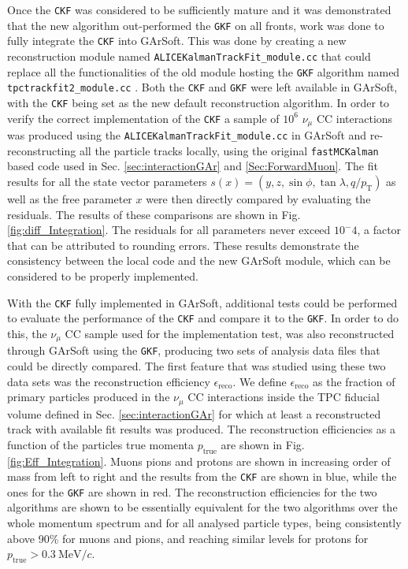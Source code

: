 Once the \texttt{CKF} was considered to be sufficiently mature and it was demonstrated that the new algorithm out-performed the \texttt{GKF} on all fronts, work was done to fully integrate the \texttt{CKF} into GArSoft. This was done by creating a new reconstruction module named \texttt{ALICEKalmanTrackFit\_module.cc} that could replace all the functionalities of the old module hosting the \texttt{GKF} algorithm named \texttt{tpctrackfit2\_module.cc} \cite{PullRequest}. Both the \texttt{CKF} and \texttt{GKF} were left available in GArSoft, with the \texttt{CKF} being set as the new default reconstruction algorithm. In order to verify the correct implementation of the \texttt{CKF} a sample of $10^6$ $\nu_\mu$ CC interactions was produced using the \texttt{ALICEKalmanTrackFit\_module.cc} in GArSoft and re-reconstructing all the particle tracks locally, using the original \texttt{fastMCKalman} based code used in Sec. \ref{sec:interactionGAr} and \ref{Sec:ForwardMuon}. The fit results for all the state vector parameters $s(x) = \left(y,z,\sin{\phi},\tan{\lambda}, q/p_{\text{T}}\right)$ as well as the free parameter $x$ were then directly compared by evaluating the residuals. The results of these comparisons are shown in Fig. \ref{fig:diff_Integration}. The residuals for all parameters never exceed $10^-4$, a factor that can be attributed to rounding errors. These results demonstrate the consistency between the local code and the new GArSoft module, which can be considered to be properly implemented.

With the \texttt{CKF} fully implemented in GArSoft, additional tests could be performed to evaluate the performance of the \texttt{CKF} and compare it to the \texttt{GKF}. In order to do this, the $\nu_\mu$ CC sample used for the implementation test, was also reconstructed through GArSoft using the \texttt{GKF}, producing two sets of analysis data files that could be directly compared. The first feature that was studied using these two data sets was the reconstruction efficiency $\epsilon_\textrm{reco}$. We define $\epsilon_\textrm{reco}$ as the fraction of primary particles produced in the $\nu_\mu$ CC interactions inside the TPC fiducial volume defined in Sec. \ref{sec:interactionGAr} for which at least a reconstructed track with available fit results was produced. The reconstruction efficiencies as a function of the particles true momenta $p_\textrm{true}$ are shown in Fig. \ref{fig:Eff_Integration}. Muons pions and protons are shown in increasing order of mass from left to right and the results from the \texttt{CKF} are shown in blue, while the ones for the \texttt{GKF} are shown in red. The reconstruction efficiencies for the two algorithms are shown to be essentially equivalent for the two algorithms over the whole momentum spectrum and for all analysed particle types, being consistently above 90\% for muons and pions, and reaching similar levels for protons for $p_\textrm{true}>0.3\ \textrm{MeV}/c$. 

